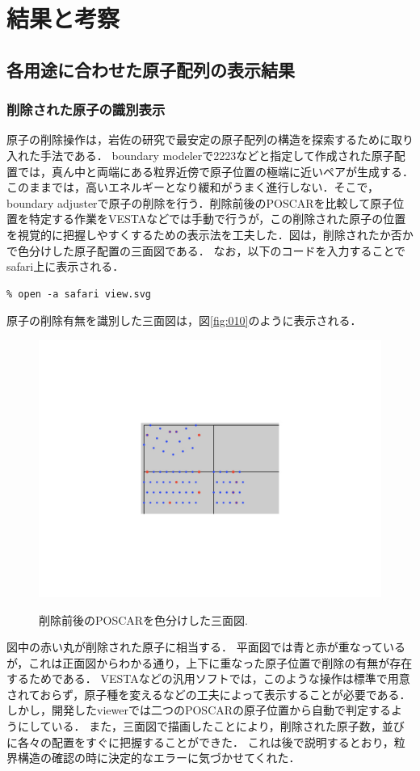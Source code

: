 
\section{結果と考察}
\subsection{各用途に合わせた原子配列の表示結果}
\subsubsection{削除された原子の識別表示}
原子の削除操作は，岩佐の研究で最安定の原子配列の構造を探索するために取り入れた手法である．
boundary modelerで2223などと指定して作成された原子配置では，真ん中と両端にある粒界近傍で原子位置の極端に近いペアが生成する．このままでは，高いエネルギーとなり緩和がうまく進行しない．そこで，boundary adjusterで原子の削除を行う．削除前後のPOSCARを比較して原子位置を特定する作業をVESTAなどでは手動で行うが，この削除された原子の位置を視覚的に把握しやすくするための表示法を工夫した．図は，削除されたか否かで色分けした原子配置の三面図である．
なお，以下のコードを入力することでsafari上に表示される．
\begin{lstlisting}[style=customCsh,basicstyle={\scriptsize\ttfamily}]
% ruby viewer.rb POSCAR_2223 POSCAR_2223_4
% open -a safari view.svg 
\end{lstlisting}
原子の削除有無を識別した三面図は，図\ref{fig:010}のように表示される．

\begin{figure}[htbp]\begin{center}
\includegraphics[width=12cm,bb= 0 0 937 753]{../figs/./boundary_narita.010.jpeg}
\caption{削除前後のPOSCARを色分けした三面図.}
\label{fig:010}
\label{default}\end{center}\end{figure}
図中の赤い丸が削除された原子に相当する．
平面図では青と赤が重なっているが，これは正面図からわかる通り，上下に重なった原子位置で削除の有無が存在するためである．
VESTAなどの汎用ソフトでは，このような操作は標準で用意されておらず，原子種を変えるなどの工夫によって表示することが必要である．
しかし，開発したviewerでは二つのPOSCARの原子位置から自動で判定するようにしている．
また，三面図で描画したことにより，削除された原子数，並びに各々の配置をすぐに把握することができた．
これは後で説明するとおり，粒界構造の確認の時に決定的なエラーに気づかせてくれた．

